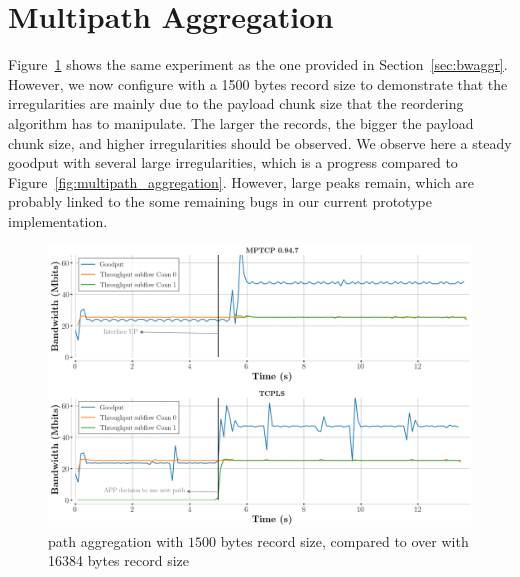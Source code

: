 \section{Multipath Aggregation}
\label{appendix:aggr}

Figure~\ref{fig:aggregation_1500bytes_records} shows the same experiment as
the one provided in Section~\ref{sec:bwaggr}. However, we now configure
\tcpls with a 1500 bytes record size to demonstrate that the
irregularities are mainly due to the payload chunk size that the reordering
algorithm has to manipulate. The larger the records, the bigger
the payload chunk size, and higher irregularities should be observed. We
observe here a steady goodput with several large irregularities, which is a
progress compared to Figure~\ref{fig:multipath_aggregation}. However, large
peaks remain, which are probably linked to the some remaining bugs in our current \tcpls 
prototype implementation. 

\begin{figure}
  \includegraphics[width=\columnwidth]{figures/aggregate_1500bytes_records_dual.png}
  \caption{\tcpls path aggregation with $1500$ bytes record size, compared to
    \tls over \mptcp with 16384 bytes record size}
  \label{fig:aggregation_1500bytes_records}
\end{figure}

